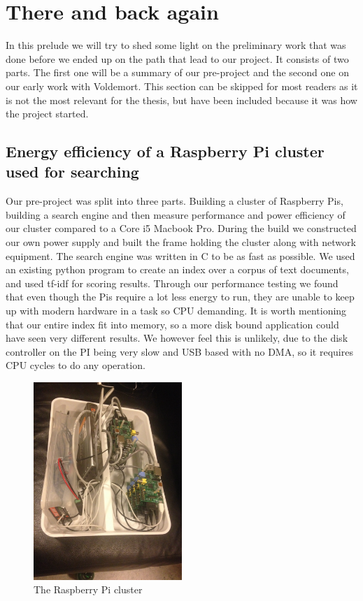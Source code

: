 \section*{There and back again}
\label{sec:prequel}
In this prelude we will try to shed some light on the preliminary work that was done before we ended up on the path that lead to our project. It consists of two parts. The first one will be a summary of our pre-project and the second one on our early work with Voldemort. 
This section can be skipped for most readers as it is not the most relevant for the thesis, but have been included because it was how the project started.

\subsection*{Energy efficiency of a Raspberry Pi cluster used for searching}
Our pre-project was split into three parts. Building a cluster of Raspberry Pis, building a search engine and then measure performance and power efficiency of our cluster compared to a Core i5 Macbook Pro. During the build we constructed our own power supply and built the frame holding the cluster along with network equipment. The search engine was written in C to be as fast as possible. We used an existing python program to create an index over a corpus of text documents, and used tf-idf for scoring results. Through our performance testing we found that even though the Pis require a lot less energy to run, they are unable to keep up with modern hardware in a task so CPU demanding. It is worth mentioning that our entire index fit into memory, so a more disk bound application could have seen very different results. We however feel this is unlikely, due to the disk controller on the PI being very slow and USB based with no DMA, so it requires CPU cycles to do any operation.

\begin{figure}[h]
    \centering
    \includegraphics[width=0.5\textwidth]{thereandbackagain/cluster_beautiful.jpg}
    \caption{The Raspberry Pi cluster}
    \label{fig:cluster}
\end{figure}

